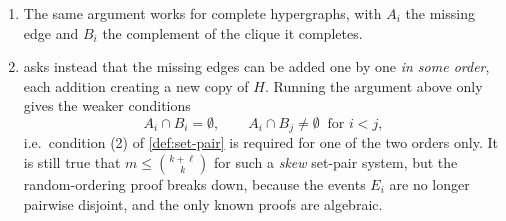 \begin{remark}\hfill
    \begin{enumerate}[(1)]
        \item The same argument works for complete hypergraphs, with \(A_i\) the missing edge and \(B_i\) the complement of the clique it completes.
        \item {} asks instead that the missing edges can be added one by one \emph{in some order}, each addition creating a new copy of \(H\). Running the argument above only gives the weaker conditions
        \[
            A_i \cap B_i = \emptyset, \qquad A_i \cap B_j \ne \emptyset \ \text{ for } i < j,
        \]
        i.e.\ condition (2) of \autoref{def:set-pair} is required for one of the two orders only. It is still true that \(m \le \binom{k+\ell}{k}\) for such a \emph{skew} set-pair system, but the random-ordering proof breaks down, because the events \(E_i\) are no longer pairwise disjoint, and the only known proofs are algebraic.
        \begin{center}
        \end{center}
    \end{enumerate}
\end{remark}
